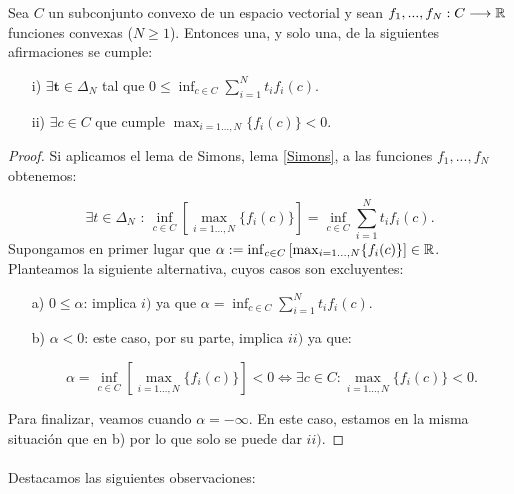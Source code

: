 	\begin{teoremaBox}\label{Gordan}
		Sea $ C $ un subconjunto convexo de un espacio vectorial y sean $ f_1,...,f_N : C \longrightarrow \mathbb{R} $ funciones convexas ($ N \geq 1 $). Entonces una, y solo una, de la siguientes afirmaciones se cumple:
		\begin{itemize}
			\item[i)] $ \exists \mathbf{t} \in \Delta_N $ tal que $ 0 \leq \inf_{c\in C}  \sum_{i=1}^{N}{t_i f_i (c)}$.
			\item[ii)] $ \exists c \in C $ que cumple $\max_{i=1\dots,N } \{f_i(c)\} < 0 $.
		\end{itemize}
	\end{teoremaBox}
	\begin{proof}
		Si aplicamos el lema de Simons, lema \ref{Simons}, a las funciones $ f_1,...,f_N $ obtenemos:
		
		\begin{equation*}
			\exists t \in \Delta_N \text{ : } \inf_{ c\in C}\left[\max_{i=1\dots,N } \{f_i(c)\} \right] = \inf_{c \in C} \sum_{i=1}^{N}t_i f_i (c).
		\end{equation*}
		Supongamos en primer lugar que $ \alpha := \inf_{ c\in C}\left[\max_{i=1\dots,N } \{f_i(c)\} \right] \in \mathbb{R} $. Planteamos la siguiente alternativa, cuyos casos son excluyentes:
		\begin{itemize}
			\item[a)] $ 0 \leq \alpha $: implica $ i) $ ya que $ \alpha = \inf_{c \in C} \sum_{i=1}^{N}t_i f_i (c) $.
			\item[b)] $ \alpha < 0 $: este caso, por su parte, implica $ ii) $ ya que:
			
			\begin{equation*}
				\alpha =\inf_{ c\in C}\left[\max_{i=1\dots,N } \{f_i(c)\} \right] < 0 \Longleftrightarrow \exists c \in C  :\max_{i=1\dots,N } \{f_i(c)\} < 0. 
			\end{equation*}  
		\end{itemize}
		Para finalizar, veamos cuando $ \alpha =-\infty $. En este caso, estamos en la misma situación que en b) por lo que solo se puede dar $ ii) $.
	\end{proof}

	\paragraph{} Destacamos las siguientes observaciones:
	
